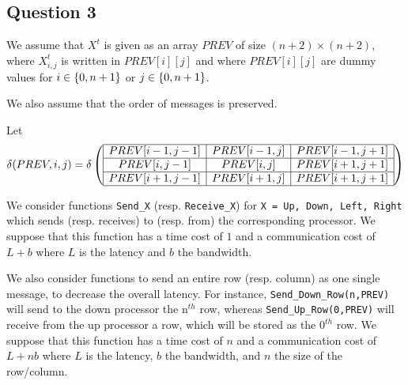 
\subsection*{Question 3}

We assume that $X^t$ is given as an array $PREV$ of size $(n+2) \times (n+2)$, where $X^t_{i,j}$
is written in $PREV[i][j]$ and where $PREV[i][j]$ are dummy values for $i \in \left\{ 0,n+1 \right\}$ or $j \in \left\{ 0,n+1 \right\}$.

We also assume that the order of messages is preserved.

Let $$\delta(PREV,i,j) = \delta \left( \begin{array}{ | c | c | c |} \hline

  PREV[i-1,j-1] & PREV[i-1,j] & PREV[i-1,j+1] \\ \hline

  PREV[i,j-1] & PREV[i,j] & PREV[i+1,j+1] \\ \hline

  PREV[i+1,j-1] & PREV[i+1,j] & PREV[i+1,j+1] \\ \hline

 \end{array} \right)$$

We consider functions \texttt{Send\_X} (resp. \texttt{Receive\_X}) for \texttt{X = Up, Down, Left, Right} which sends (resp. receives) to (resp. from) the corresponding processor. 
We suppose that this function has a time cost of $1$ and a communication cost of $L+b$ where $L$ is the latency and $b$ the bandwidth.

We also consider functions to send an entire row (resp. column) as one single message, to decrease the overall latency. For instance, \texttt{Send\_Down\_Row(n,PREV)} will send to the down processor the $\text{n}^{th}$ row, whereas \texttt{Send\_Up\_Row(0,PREV)} will receive from the up processor a row, which will be stored as the $\text{0}^{th}$ row.
We suppose that this function has a time cost of $n$ and a communication cost of $L+nb$ where $L$ is the latency, $b$ the bandwidth, and $n$ the size of the row/column.


